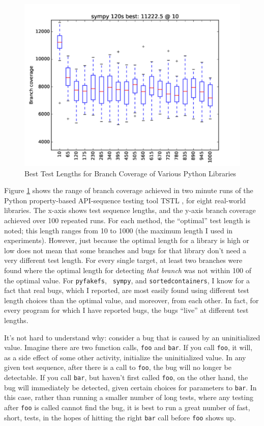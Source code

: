 \documentclass[sigplan,screen]{acmart}
\begin{document}
\begin{figure}
\includegraphics[width=0.8\columnwidth]{graphs/sympyrand120}
\caption{Best Test Lengths for Branch Coverage of Various Python
  Libraries}
\label{fig:length}

\end{figure}

Figure \ref{fig:length} shows the range of branch coverage achieved in
two minute runs of the Python property-based API-sequence testing tool
TSTL \cite{tstlsttt}, for
eight real-world libraries.  The x-axis shows test sequence lengths,
and the y-axis branch coverage achieved over 100 repeated runs.  For
each method, the ``optimal'' test length is noted; this length ranges
from 10 to 1000 (the maximum length I used in experiments).  However,
just because the optimal length for a library is high or low does not
mean that some branches and bugs for that library don't need a very
different test length.  For every single target, at least two branches
were found where the optimal length for detecting \emph{that branch}
was not within 100 of the optimal value.  For {\tt pyfakefs}, {\tt
  sympy}, and {\tt sortedcontainers}, I know for a fact that real
bugs, which I reported, are most easily found using different test
length choices than the optimal value, and moreover, from each other.
In fact, for every program for which I have reported bugs, the bugs
``live'' at different test lengths.

It's not hard to understand why:  consider a bug that is caused by an
uninitialized value.  Imagine there are two function calls, {\tt foo}
and {\tt bar}.  If you call {\tt foo}, it will, as a side effect of
some other activity, initialize the uninitialized value.  In any given
test sequence, after there is a call to {\tt foo}, the bug will no
longer be detectable.  If you call {\tt bar}, but haven't first called
{\tt foo}, on the other hand, the bug will immediately be detected,
given certain choices for parameters to {\tt bar}.  In this case,
rather than running a smaller number of long tests, where any testing
after {\tt foo} is called cannot find the bug, it is best to run a
great number of fast, short, tests, in the hopes of hitting the right
{\tt bar} call before {\tt foo} shows up.
\end{document}
